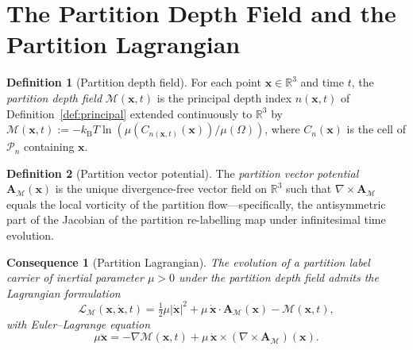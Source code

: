 \documentclass[11pt,twocolumn,a4paper]{article}
\theoremstyle{axiomstyle}
\theoremstyle{conseqstyle}
\newtheorem{consequence}{Consequence}
\theoremstyle{definition}
\newtheorem{definition}{Definition}
\theoremstyle{remark}
\newcommand{\kB}{k_{\mathrm{B}}}
\newcommand{\Depth}{\mathcal{M}}
\newcommand{\Partition}{\mathcal{P}}
\newcommand{\Real}{\mathbb{R}}
\newcommand{\Apartition}{\bm{A}_{\Depth}}
\newcommand{\Lagr}{\mathcal{L}}
\begin{document}
\section{The Partition Depth Field and the Partition Lagrangian}
\label{sec:partitionlagrangian}

\begin{definition}[Partition depth field]
\label{def:depthfield}
For each point $\mathbf{x}\in\Real^{3}$ and time $t$, the \emph{partition depth field} $\Depth(\mathbf{x},t)$ is the principal depth index $n(\mathbf{x},t)$ of Definition~\ref{def:principal} extended continuously to $\Real^{3}$ by $\Depth(\mathbf{x},t):=-\kB T\ln(\mu(C_{n(\mathbf{x},t)}(\mathbf{x}))/\mu(\Omega))$, where $C_{n}(\mathbf{x})$ is the cell of $\Partition_{n}$ containing $\mathbf{x}$.
\end{definition}

\begin{definition}[Partition vector potential]
\label{def:partitionA}
The \emph{partition vector potential} $\Apartition(\mathbf{x})$ is the unique divergence-free vector field on $\Real^{3}$ such that $\nabla\times\Apartition$ equals the local vorticity of the partition flow---specifically, the antisymmetric part of the Jacobian of the partition re-labelling map under infinitesimal time evolution.
\end{definition}

\begin{consequence}[Partition Lagrangian]
\label{cons:partitionlagrangian}
The evolution of a partition label carrier of inertial parameter $\mu>0$ under the partition depth field admits the Lagrangian formulation
\begin{equation}
\Lagr_{\Depth}(\mathbf{x},\dot{\mathbf{x}},t)=\tfrac{1}{2}\mu|\dot{\mathbf{x}}|^{2}+\mu\,\dot{\mathbf{x}}\cdot\Apartition(\mathbf{x})-\Depth(\mathbf{x},t),
\label{eq:partitionlagrangian}
\end{equation}
with Euler--Lagrange equation
\begin{equation}
\mu\ddot{\mathbf{x}}=-\nabla\Depth(\mathbf{x},t)+\mu\,\dot{\mathbf{x}}\times(\nabla\times\Apartition)(\mathbf{x}).
\label{eq:partitionel}
\end{equation}
\end{consequence}
\end{document}
